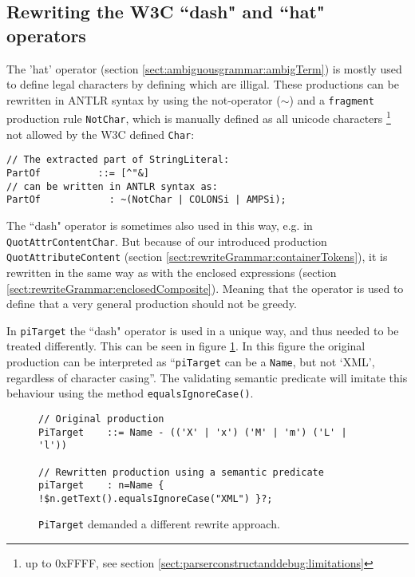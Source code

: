 \subsection{Rewriting the W3C ``dash" and ``hat" operators}
\label{sect:implementation:dashOperator}
The 'hat' operator (section \ref{sect:ambiguousgrammar:ambigTerm}) is mostly used to define legal characters by defining which are illigal. These productions can be rewritten in ANTLR syntax by using the not-operator ($\sim$) and a \verb!fragment! production rule \verb!NotChar!, which is manually defined as all unicode characters \footnote{up to 0xFFFF, see section \ref{sect:parserconstructanddebug:limitations}} not allowed by the W3C defined \verb!Char!:
\begin{Verbatim}
// The extracted part of StringLiteral:
PartOf          ::= [^"&]
// can be written in ANTLR syntax as:
PartOf            : ~(NotChar | COLONSi | AMPSi);
\end{Verbatim}
The ``dash" operator is sometimes also used in this way, e.g. in \verb!QuotAttrContentChar!. But because of our introduced production \verb!QuotAttributeContent! (section \ref{sect:rewriteGrammar:containerTokens}), it is rewritten in the same way as with the enclosed expressions (section \ref{sect:rewriteGrammar:enclosedComposite}). Meaning that the operator is used to define that a very general production should not be greedy. 

In \verb!piTarget! the ``dash" operator is used in a unique way, and thus needed to be treated differently. This can be seen in figure \ref{fig:pitargetRewritten}. In this figure the original production can be interpreted as ``\texttt{piTarget} can be a \texttt{Name}, but not `XML', regardless of character casing''. The validating semantic predicate will imitate this behaviour using the method \verb!equalsIgnoreCase()!.
\begin{figure}[h!]
\begin{Verbatim}
// Original production
PiTarget    ::= Name - (('X' | 'x') ('M' | 'm') ('L' | 'l'))

// Rewritten production using a semantic predicate
piTarget    : n=Name { !$n.getText().equalsIgnoreCase("XML") }?;
\end{Verbatim}
\caption[Rewrite of 'dash' operator]{\texttt{PiTarget} demanded a different rewrite approach.}
\label{fig:pitargetRewritten}
\end{figure}


